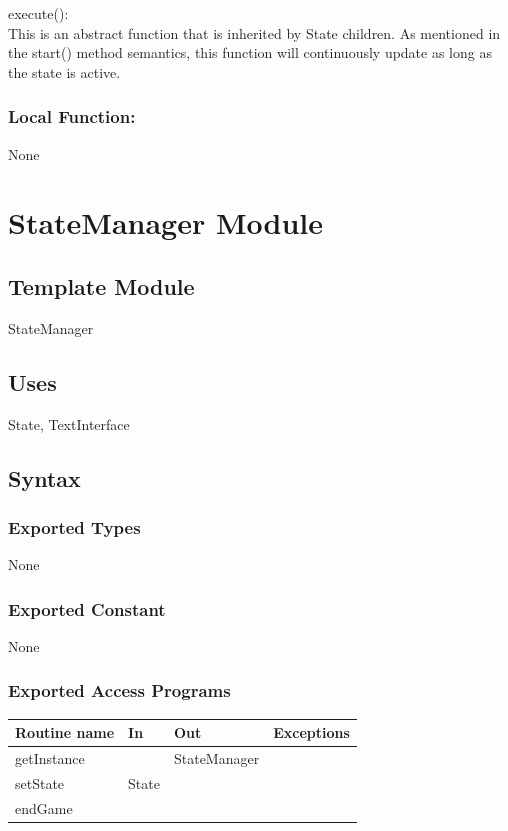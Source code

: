 \documentclass[12pt]{article}
\begin{document}
\noindent execute():\\
This is an abstract function that is inherited by State children. As mentioned in the start() method semantics, this function will continuously update as long as the state is active.

\subsubsection*{Local Function:}

None

\newpage

\section* {StateManager Module}

\subsection* {Template Module}

StateManager

\subsection* {Uses}

State, TextInterface

\subsection* {Syntax}

\subsubsection* {Exported Types}

None

\subsubsection* {Exported Constant}

None

\subsubsection* {Exported Access Programs}

\begin{tabular}{| l | l | l | l |}
\hline
\textbf{Routine name} & \textbf{In} & \textbf{Out} & \textbf{Exceptions}\\
\hline
getInstance & ~ & StateManager & \\
\hline
setState & State & ~ & \\
\hline
endGame & ~ & ~ & \\
\hline
\end{tabular}
\end{document}
